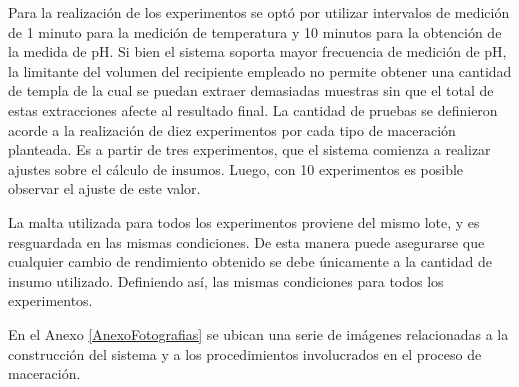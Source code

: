         \par Para la realización de los experimentos se optó por utilizar intervalos de medición de 1 minuto para la medición de temperatura y 10 minutos para la obtención de la medida de pH. Si bien el sistema soporta mayor frecuencia de medición de pH, la limitante del volumen del recipiente empleado no permite obtener una cantidad de templa de la cual se puedan extraer demasiadas muestras sin que el total de estas extracciones afecte al resultado final. La cantidad de pruebas se definieron acorde a la realización de diez experimentos por cada tipo de maceración planteada. Es a partir de tres experimentos, que el sistema comienza a realizar ajustes sobre el cálculo de insumos. Luego, con 10 experimentos es posible observar el ajuste de este valor.
        
        \par La malta utilizada para todos los experimentos proviene del mismo lote, y es resguardada en las mismas condiciones. De esta manera puede asegurarse que cualquier cambio de rendimiento obtenido se debe únicamente a la cantidad de insumo utilizado. Definiendo así, las mismas condiciones para todos los experimentos.
        
        En el Anexo \ref{AnexoFotografias} se ubican una serie de imágenes relacionadas a la construcción del sistema y a los procedimientos involucrados en el proceso de maceración.
    
